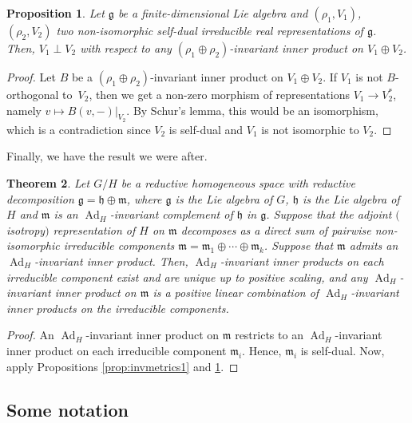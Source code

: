 \documentclass[pdftex]{sigma}
\numberwithin{equation}{section}
\newtheorem{Theorem}{Theorem}[section]
\newtheorem{Proposition}[Theorem]{Proposition}
{ \theoremstyle{definition}
	\newtheorem{Definition}[Theorem]{Definition}
	\newtheorem{Note}[Theorem]{Note}
	\newtheorem{Example}[Theorem]{Example}
	\newtheorem{Remark}[Theorem]{Remark} }
\newcommand{\restr}[1]{|_{#1}}
\DeclareMathOperator{\Ad}{Ad}
\begin{document}
		\begin{Proposition}\label{prop:invmetrics2}
			Let $\mathfrak{g}$ be a finite-dimensional Lie algebra and $(\rho_1,V_1)$, $(\rho_2,V_2)$ two \textit{non-isomorphic self-dual} irreducible real representations of $\mathfrak{g}$. Then, $V_1 \perp V_2$ with respect to any $(\rho_1 \oplus \rho_2)$-invariant inner product on $V_1 \oplus V_2$.
		\end{Proposition}
		
		\begin{proof}
			Let $B$ be a $(\rho_1 \oplus \rho_2)$-invariant inner product on $V_1 \oplus V_2$. If $V_1$ is not $B$-orthogonal to~$V_2$, then we get a non-zero morphism of representations $V_1 \to V_2^{*}$, namely $v \mapsto B(v,-)\restr{V_2}$. By Schur's lemma, this would be an isomorphism, which is a contradiction since $V_2$ is self-dual and $V_1$ is not isomorphic to $V_2$.
		\end{proof}

		Finally, we have the result we were after.

		\begin{Theorem}\label{thm:inv_metrics}
			Let $G/H$ be a reductive homogeneous space with reductive decomposition $\mathfrak{g} = \mathfrak{h} \oplus \mathfrak{m}$, where $\mathfrak{g}$ is the Lie algebra of $G$, $\mathfrak{h}$ is the Lie algebra of $H$ and $\mathfrak{m}$ is an $\Ad_H$-invariant complement of $\mathfrak{h}$ in $\mathfrak{g}$. Suppose that the adjoint $($isotropy$)$ representation of $H$ on $\mathfrak{m}$ decomposes as a direct sum of \textit{pairwise non-isomorphic} irreducible components $\mathfrak{m} = \mathfrak{m}_1 \oplus \cdots \oplus \mathfrak{m}_k$. Suppose that $\mathfrak{m}$ admits an $\Ad_H$-invariant inner product. Then, $\Ad_H$-invariant inner products on each irreducible component exist and are unique up to positive scaling, and any $\Ad_H$-invariant inner product on $\mathfrak{m}$ is a positive linear combination of $\Ad_H$-invariant inner products on the irreducible components.
		\end{Theorem}
		\begin{proof}
			An $\Ad_H$-invariant inner product on $\mathfrak{m}$ restricts to an $\Ad_H$-invariant inner product on each irreducible component $\mathfrak{m}_i$. Hence, $\mathfrak{m}_i$ is self-dual. Now, apply Propositions \ref{prop:invmetrics1} and \ref{prop:invmetrics2}.
		\end{proof}
		
		
		\subsection{Some notation} \label{sec:notation}
		
\end{document}
